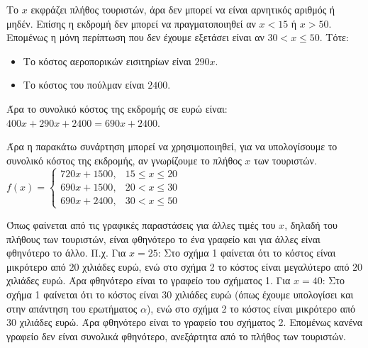 \begin{alist}
\begin{rlist}
\item Το $x$ εκφράζει πλήθος τουριστών, άρα δεν μπορεί να είναι αρνητικός αριθμός ή μηδέν.
Επίσης η εκδρομή δεν μπορεί να πραγματοποιηθεί αν $x < 15$ ή $x > 50$. Επομένως η μόνη περίπτωση που δεν έχουμε εξετάσει είναι αν $30 < x \le 50$.
Τότε:
\begin{itemize}
\item Το κόστος αεροπορικών εισιτηρίων είναι $290x$.
\item Το κόστος του πούλμαν είναι $2400$.
\end{itemize}
Άρα το συνολικό κόστος της εκδρομής σε ευρώ είναι:
$400x + 290x + 2400 = 690x + 2400$.

Άρα η παρακάτω συνάρτηση μπορεί να χρησιμοποιηθεί, για να υπολογίσουμε το συνολικό κόστος της εκδρομής, αν γνωρίζουμε το πλήθος $x$ των τουριστών.
$f(x) = \begin{cases}
720x + 1500, & 15 \le x \le 20 \\
690x + 1500, & 20 < x \le 30 \\
690x + 2400, & 30 < x \le 50
\end{cases}$
\end{rlist}

\item Όπως φαίνεται από τις γραφικές παραστάσεις για άλλες τιμές του $x$, δηλαδή του πλήθους των τουριστών, είναι φθηνότερο το ένα γραφείο και για άλλες είναι φθηνότερο το άλλο.
Π.χ.
Για $x = 25$:
Στο σχήμα 1 φαίνεται ότι το κόστος είναι μικρότερο από $20$ χιλιάδες ευρώ, ενώ στο σχήμα 2 το κόστος είναι μεγαλύτερο από $20$ χιλιάδες ευρώ.
Άρα φθηνότερο είναι το γραφείο του σχήματος 1.
Για $x = 40$:
Στο σχήμα 1 φαίνεται ότι το κόστος είναι $30$ χιλιάδες ευρώ (όπως έχουμε υπολογίσει και στην απάντηση του ερωτήματος $\alpha$), ενώ στο σχήμα 2 το κόστος είναι μικρότερο από $30$ χιλιάδες ευρώ.
Άρα φθηνότερο είναι το γραφείο του σχήματος 2.
Επομένως κανένα γραφείο δεν είναι συνολικά φθηνότερο, ανεξάρτητα από το πλήθος των τουριστών.
\end{alist}

